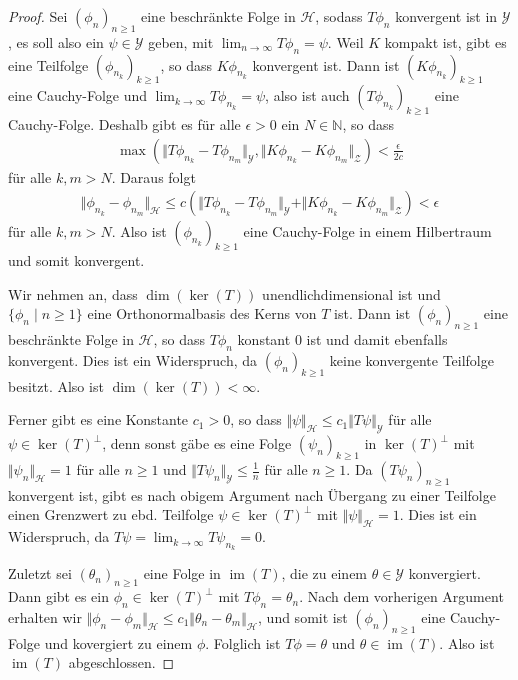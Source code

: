 \documentclass[11pt, hidelinks]{article}
\newcommand{\h}{\mathcal{H}}
\newcommand{\im}{\operatorname{im}}
\newcommand{\on}{{n \geq 1}}
\numberwithin{conj}{section}
\begin{document}
\begin{proof}
    Sei $(\phi_n)_{n \geq 1}$ eine beschränkte Folge in $\h$, sodass $T \phi_n$ konvergent ist in $\mathcal{Y}$, es soll also ein $\psi \in \mathcal{Y}$ geben, mit $\lim_{n\to\infty} T\phi_n = \psi$. Weil $K$ kompakt ist, gibt es eine Teilfolge $(\phi_{n_k})_{k \geq 1}$, so dass $K \phi_{n_k}$ konvergent ist. Dann ist $(K\phi_{n_k})_{k \geq 1}$ eine Cauchy-Folge und $\lim_{k\to\infty} T\phi_{n_k} = \psi$, also ist auch $(T\phi_{n_k})_{k \geq 1}$ eine Cauchy-Folge. Deshalb gibt es für alle $\epsilon > 0$ ein $N\in \mathbb{N}$, so dass
    \begin{align}
        \max(\Vert T\phi_{n_k}-T\phi_{n_m} \Vert_{\mathcal{Y}}, \Vert K\phi_{n_k}-K\phi_{n_m} \Vert_{\mathcal{Z}}) < \frac{\epsilon}{2c}
    \end{align}
    für alle $k,m > N$. Daraus folgt
    \begin{align}
        \Vert \phi_{n_k} - \phi_{n_m} \Vert_\h \leq c (\Vert T\phi_{n_k}-T\phi_{n_m} \Vert_{\mathcal{Y}} +  \Vert K\phi_{n_k}-K\phi_{n_m} \Vert_{\mathcal{Z}}) < \epsilon
    \end{align}
    für alle $k,m > N$. Also ist $(\phi_{n_k})_{k \geq 1}$ eine Cauchy-Folge in einem Hilbertraum und somit konvergent.

    Wir nehmen an, dass $\dim(\ker(T))$ unendlichdimensional ist und $\{\phi_n \;\vert\; n \geq 1\}$ eine Orthonormalbasis des Kerns von $T$ ist. Dann ist $(\phi_n)_{n \geq 1}$ eine beschränkte Folge in $\h$, so dass $T \phi_n$ konstant $0$ ist und damit ebenfalls konvergent. Dies ist ein Widerspruch, da $(\phi_n)_{k \geq 1}$ keine konvergente Teilfolge besitzt. Also ist $\dim(\ker(T)) < \infty$.

    Ferner gibt es eine Konstante $c_1 > 0$, so dass $\Vert \psi \Vert_\h \leq c_1 \Vert T\psi \Vert_{\mathcal{Y}}$ für alle $\psi \in \ker(T)^\perp$, denn sonst gäbe es eine Folge $(\psi_n)_{k \geq 1}$ in $\ker(T)^\perp$ mit $\Vert \psi_n \Vert_\h = 1$ für alle $n \geq 1$ und $\Vert T\psi_n \Vert_{\mathcal{Y}} \leq \frac{1}{n}$ für alle $n \geq 1$. Da $(T\psi_n)_\on$ konvergent ist, gibt es nach obigem Argument nach Übergang zu einer Teilfolge einen Grenzwert zu ebd. Teilfolge $\psi \in \ker(T)^\perp$ mit $\Vert \psi \Vert_\h = 1$. Dies ist ein Widerspruch, da $T \psi = \lim_{k\to\infty} T \psi_{n_k} = 0$.

    Zuletzt sei $(\theta_n)_{n \geq 1}$ eine Folge in $\im(T)$, die zu einem $\theta \in \mathcal{Y}$ konvergiert. Dann gibt es ein $\phi_n \in \ker(T)^\perp$ mit $T\phi_n = \theta_n$. Nach dem vorherigen Argument erhalten wir $\Vert\phi_n-\phi_m\Vert_\h \leq c_1 \Vert \theta_n - \theta_m \Vert_\h$, und somit ist $(\phi_n)_{n\geq 1}$ eine Cauchy-Folge und kovergiert zu einem $\phi$. Folglich ist $T\phi = \theta$ und $\theta \in \im(T)$. Also ist $\im(T)$ abgeschlossen.
\end{proof}

\singlespacing
\nocite{*}


\end{document}
